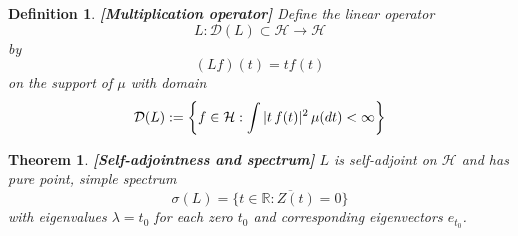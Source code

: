 \documentclass{article}
\newcommand{\assign}{:=}
\newcommand{\tmstrong}[1]{\textbf{#1}}
\newtheorem{definition}{Definition}
\newtheorem{theorem}{Theorem}
\begin{document}
\begin{definition}
  {\tmstrong{[Multiplication operator]\label{def:L}}} Define the linear
  operator
  \begin{equation}
    L : \mathcal{D} (L) \subset \mathcal{H} \to \mathcal{H}
  \end{equation}
  by
  \begin{equation}
    (Lf) (t) = tf (t)
  \end{equation}
  on the support of $\mu$ with domain
  \begin{equation}
    \mathcal{D} (L) \assign \left\{ f \in \mathcal{H}: \int |t \hspace{0.17em}
    f (t) |^2  \hspace{0.17em} \mu (dt) < \infty \right\}
  \end{equation}
\end{definition}

\begin{theorem}
  {\tmstrong{[Self-adjointness and spectrum]\label{thm:spectrum}}} $L$ is
  self-adjoint on $\mathcal{H}$ and has pure point, simple spectrum
  \begin{equation}
    \sigma (L) = \overline{\{t \in \mathbb{R}: Z (t) = 0\}}
  \end{equation}
  with eigenvalues $\lambda = t_0$ for each zero $t_0$ and corresponding
  eigenvectors $e_{t_0}$.
\end{theorem}
\end{document}
